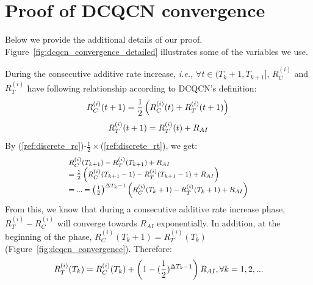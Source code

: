 \section{Proof of DCQCN convergence}
\label{sec:alpha_proof}

Below we provide the additional details of our proof. 
Figure~\ref{fig:dcqcn_convergence_detailed} illustrates some of the variables we use.

During the consecutive additive rate increase, {\em i.e.,} 
$\forall t \in ({T_k} + 1,{T_{k + 1}}]$, $R_C^{(i)}$ and $R_T^{(i)}$ 
have following relationship according to DCQCN's definition:
\begin{equation}
\small
R_C^{(i)}(t + 1) = \frac{1}{2}\left( {R_C^{(i)}(t) + R_T^{(i)}(t + 1)} \right)\\
\label{ref:discrete_rc}
\end{equation}
\begin{equation}
\small
R_T^{(i)}(t + 1) = R_T^{(i)}(t) + {R_{AI}}
\label{ref:discrete_rt}
\end{equation}
By (\ref{ref:discrete_rc})-$\frac{1}{2}\times$(\ref{ref:discrete_rt}), we get:
\begin{equation}
\small
\begin{array}{l}
R_C^{(i)}(T_{k + 1}) - R_T^{(i)}(T_{k + 1}) + {R_{AI}}\\
 = \frac{1}{2}\left( {R_C^{(i)}(T_{k + 1} - 1) - R_T^{(i)}(T_{k + 1} - 1) + {R_{AI}}} \right)\\
 = ... = {\left( {\frac{1}{2}} \right)^{\Delta {T_k}-1}}\left( {R_C^{(i)}({T_k} + 1) - R_T^{(i)}({T_k} + 1) + {R_{AI}}} \right)
\end{array}
\end{equation}
From this, we know that during a consecutive additive rate increase phase, $R_T^{(i)} - R_C^{(i)}$
will converge towards $R_{AI}$ exponentially. In addition, at the beginning of the phase, 
$R_C^{(i)}({T_k} + 1) = R_T^{(i)}({T_k})$ (Figure~\ref{fig:dcqcn_convergence}). Therefore:
\begin{equation}
\small
R_T^{(i)}({T_k}) = R_C^{(i)}({T_k}) + \left( 1 - ({\frac{1}{2}})^{\Delta {T_k}-1}\right){R_{AI}},\forall k = 1,2,...
\label{eq:convergence_rt}
\end{equation}

